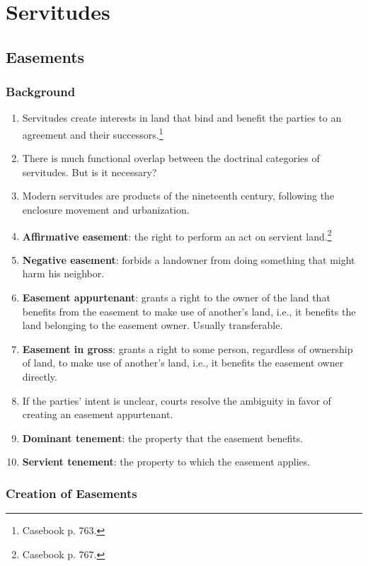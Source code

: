 \section{Servitudes}

\subsection{Easements}

\subsubsection{Background}

\begin{enumerate}
    \item Servitudes create interests in land that bind and benefit the 
    parties to an agreement and their successors.\footnote{Casebook p. 763.}
    \item There is much functional overlap between the doctrinal categories of 
    servitudes. But is it necessary?
    \item Modern servitudes are products of the nineteenth century, following 
    the enclosure movement and urbanization.
    \item \textbf{Affirmative easement}: the right to perform an act on 
    servient land.\footnote{Casebook p. 767.}
    \item \textbf{Negative easement}: forbids a landowner from doing something 
    that might harm his neighbor.
    \item \textbf{Easement appurtenant}: grants a right to the owner of the 
    land that benefits from the easement to make use of another's land, i.e., 
    it benefits the land belonging to the easement owner. Usually 
    transferable.
    \item \textbf{Easement in gross}: grants a right to some person, 
    regardless of ownership of land, to make use of another's land, i.e., it 
    benefits the easement owner directly. 
    \item If the parties' intent is unclear, courts resolve the ambiguity in 
    favor of creating an easement appurtenant.
    \item \textbf{Dominant tenement}: the property that the easement benefits.
    \item \textbf{Servient tenement}: the property to which the easement 
    applies.
\end{enumerate}

\subsubsection{Creation of Easements}

